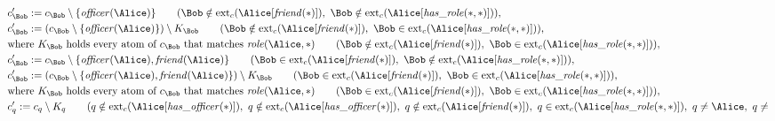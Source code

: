 \begin{align*}
&
c'_
{
\Bob
}
 := 
c_
{
\Bob
}
 \setminus 
\{
\mathit{\detokenize{
officer
}}
(
\Alice
)
\}
 \qquad (
\Bob
 \notin 
\mathrm{ext}_c(
\Alice
[
\mathit{\detokenize{
friend
}}
(
\ast
)
]
)
,\ 
\Bob
 \notin 
\mathrm{ext}_c(
\Alice
[
\mathit{\detokenize{
has_role
}}
(
\ast
,
\ast
)
]
)
)
,\\
&
c'_
{
\Bob
}
 := 
(c_
{
\Bob
}
 \setminus 
\{
\mathit{\detokenize{
officer
}}
(
\Alice
)
\}
) \setminus K_
{
\Bob
}
 \qquad (
\Bob
 \notin 
\mathrm{ext}_c(
\Alice
[
\mathit{\detokenize{
friend
}}
(
\ast
)
]
)
,\ 
\Bob
 \in 
\mathrm{ext}_c(
\Alice
[
\mathit{\detokenize{
has_role
}}
(
\ast
,
\ast
)
]
)
)
,\\
&
\text{where } K_
{
\Bob
}
 \text{ holds every atom of } c_
{
\Bob
}
 \text{ that matches } 
\mathit{\detokenize{
role
}}
(
\Alice
,
\ast
)
 \qquad (
\Bob
 \notin 
\mathrm{ext}_c(
\Alice
[
\mathit{\detokenize{
friend
}}
(
\ast
)
]
)
,\ 
\Bob
 \in 
\mathrm{ext}_c(
\Alice
[
\mathit{\detokenize{
has_role
}}
(
\ast
,
\ast
)
]
)
)
,\\
&
c'_
{
\Bob
}
 := 
c_
{
\Bob
}
 \setminus 
\{
\mathit{\detokenize{
officer
}}
(
\Alice
)
,
\mathit{\detokenize{
friend
}}
(
\Alice
)
\}
 \qquad (
\Bob
 \in 
\mathrm{ext}_c(
\Alice
[
\mathit{\detokenize{
friend
}}
(
\ast
)
]
)
,\ 
\Bob
 \notin 
\mathrm{ext}_c(
\Alice
[
\mathit{\detokenize{
has_role
}}
(
\ast
,
\ast
)
]
)
)
,\\
&
c'_
{
\Bob
}
 := 
(c_
{
\Bob
}
 \setminus 
\{
\mathit{\detokenize{
officer
}}
(
\Alice
)
,
\mathit{\detokenize{
friend
}}
(
\Alice
)
\}
) \setminus K_
{
\Bob
}
 \qquad (
\Bob
 \in 
\mathrm{ext}_c(
\Alice
[
\mathit{\detokenize{
friend
}}
(
\ast
)
]
)
,\ 
\Bob
 \in 
\mathrm{ext}_c(
\Alice
[
\mathit{\detokenize{
has_role
}}
(
\ast
,
\ast
)
]
)
)
,\\
&
\text{where } K_
{
\Bob
}
 \text{ holds every atom of } c_
{
\Bob
}
 \text{ that matches } 
\mathit{\detokenize{
role
}}
(
\Alice
,
\ast
)
 \qquad (
\Bob
 \in 
\mathrm{ext}_c(
\Alice
[
\mathit{\detokenize{
friend
}}
(
\ast
)
]
)
,\ 
\Bob
 \in 
\mathrm{ext}_c(
\Alice
[
\mathit{\detokenize{
has_role
}}
(
\ast
,
\ast
)
]
)
)
,\\
&
c'_
q
 := 
c_
q
 \setminus K_
q
 \qquad (
q
 \notin 
\mathrm{ext}_c(
\Alice
[
\mathit{\detokenize{
has_officer
}}
(
\ast
)
]
)
,\ 
q
 \notin 
\mathrm{ext}_c(
\Alice
[
\mathit{\detokenize{
has_officer
}}
(
\ast
)
]
)
,\ 
q
 \notin 
\mathrm{ext}_c(
\Alice
[
\mathit{\detokenize{
friend
}}
(
\ast
)
]
)
,\ 
q
 \in 
\mathrm{ext}_c(
\Alice
[
\mathit{\detokenize{
has_role
}}
(
\ast
,
\ast
)
]
)
,\ 
q \neq 
\Alice
,\ 
q \neq 

\end{align*}
